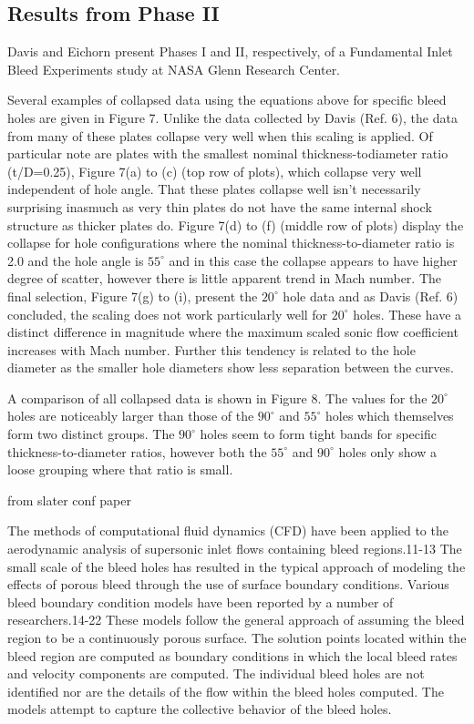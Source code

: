 \documentclass{article}
\begin{document}
\subsection{Results from Phase II}
Davis \cite{Davis2012} and Eichorn \cite{Eichorn2013} present Phases I and II, respectively, of a Fundamental Inlet Bleed Experiments study at NASA Glenn Research Center.

Several examples of collapsed data using the equations above for specific bleed holes are given in Figure 7. Unlike the data collected by Davis (Ref. 6), the data from many of these plates collapse very well when this scaling is applied. Of particular note are plates with the smallest nominal thickness-todiameter ratio (t/D=0.25), Figure 7(a) to (c) (top row of plots), which collapse very well independent of hole angle. That these plates collapse well isn’t necessarily surprising inasmuch as very thin plates do not have the same internal shock structure as thicker plates do. Figure 7(d) to (f) (middle row of plots) display the collapse for hole configurations where the nominal thickness-to-diameter ratio is 2.0 and the hole angle is $55^\circ$ and in this case the collapse appears to have higher degree of scatter, however there is little apparent trend in Mach number. The final selection, Figure 7(g) to (i), present the $20^\circ$ hole data and as Davis (Ref. 6) concluded, the scaling does not work particularly well for $20^\circ$ holes. These have a distinct difference in magnitude where the maximum scaled sonic flow coefficient increases with Mach number. Further this tendency is related to the hole diameter as the smaller hole diameters show less separation between the curves.

A comparison of all collapsed data is shown in Figure 8. The values for the $20^\circ$ holes are noticeably larger than those of the $90^\circ$ and $55^\circ$ holes which themselves form two distinct groups. The $90^\circ$ holes seem to form tight bands for specific thickness-to-diameter ratios, however both the $55^\circ$ and $90^\circ$ holes only show a loose grouping where that ratio is small.


from slater conf paper

The methods of computational fluid dynamics (CFD) have been applied to the aerodynamic analysis of supersonic inlet flows containing bleed regions.11-13 The small scale of the bleed holes has resulted in the typical approach of modeling the effects of porous bleed through the use of surface boundary conditions. Various bleed boundary condition models have been reported by a number of researchers.14-22 These models follow the general approach of assuming the bleed region to be a continuously porous surface. The solution points located within the bleed region are computed as boundary conditions in which the local bleed rates and velocity components are computed. The individual bleed holes are not identified nor are the details of the flow within the bleed holes computed. The models attempt to capture the collective behavior of the bleed holes.
\end{document}
